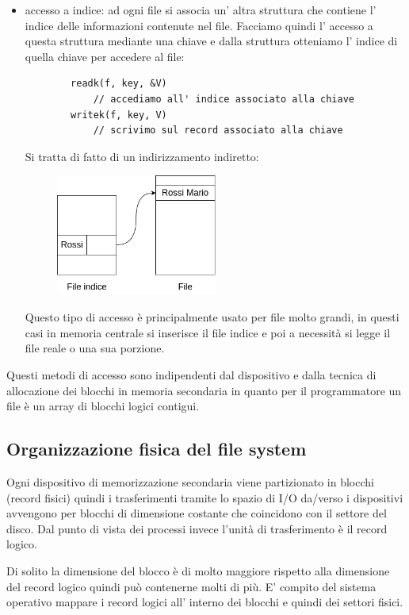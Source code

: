 {\begin{itemize}
    \item accesso a indice: ad ogni file si associa un' altra struttura che contiene l' indice delle informazioni contenute nel file.
    Facciamo quindi l' accesso a questa struttura mediante una chiave e dalla struttura otteniamo l' indice di quella chiave per accedere al file:
    \begin{verbatim}
        readk(f, key, &V)
            // accediamo all' indice associato alla chiave
        writek(f, key, V)
            // scrivimo sul record associato alla chiave
    \end{verbatim}
    Si tratta di fatto di un indirizzamento indiretto:
    \begin{figure}[H]
        \centering
        \includegraphics[width=200px]{images/11_File_System/accesso_a_indice.png}
    \end{figure}
    Questo tipo di accesso è principalmente usato per file molto grandi, in questi casi in memoria centrale si inserisce il file indice e poi a necessità si legge il file reale o una sua porzione.

\end{itemize}
Questi metodi di accesso sono indipendenti dal dispositivo e dalla tecnica di allocazione dei blocchi in memoria secondaria in quanto per il programmatore un file è un array di blocchi logici contigui.

\subsection{Organizzazione fisica del file system}
Ogni dispositivo di memorizzazione secondaria viene partizionato in blocchi (record fisici) quindi i trasferimenti tramite lo spazio di I/O da/verso i dispositivi avvengono per blocchi di dimensione costante che coincidono con il settore del disco.
Dal punto di vista dei processi invece l'unità di trasferimento è il record logico.

Di solito la dimensione del blocco è di molto maggiore rispetto alla dimensione del record logico quindi può contenerne molti di più.
E' compito del sistema operativo mappare i record logici all' interno dei blocchi e quindi dei settori fisici.

}
